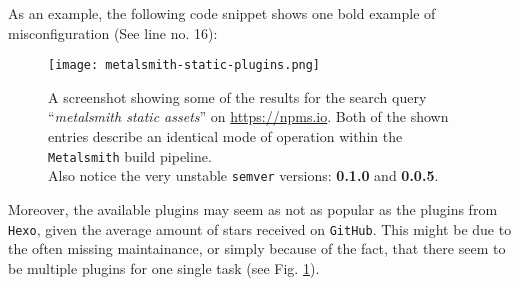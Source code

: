 As an example, the following code snippet shows one bold example of misconfiguration (See line no. 16):


\label{list:metalsmith}

\begin{figure}[b] %
    \centering
    \texttt{[image: metalsmith-static-plugins.png]}
    \caption{A screenshot showing some of the results for the search query ``\emph{metalsmith static assets}'' on \url{https://npms.io}. Both of the shown entries describe an identical mode of operation within the \texttt{Metalsmith} build pipeline.\\
    Also notice the very unstable \texttt{semver} versions: \textbf{0.1.0} and \textbf{0.0.5}.}
    \label{fig:metalsmith-plugins}
\end{figure}
%

Moreover, the available plugins may seem as not as popular as the plugins from \texttt{Hexo}, given the average amount of stars received on \texttt{GitHub}. This might be due to the often missing maintainance, or simply because of the fact, that there seem to be multiple plugins for one single task (see Fig. \ref{fig:metalsmith-plugins}).
